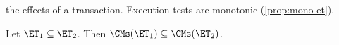 the effects of a transaction. 
Execution tests are monotonic (\cref{prop:mono-et}).
\begin{proposition}
\label{prop:mono-et}
Let $\ET_1 \subseteq \ET_2$. Then $\CMs(\ET_1) \subseteq \CMs(\ET_2)$.
\end{proposition}
%
%

